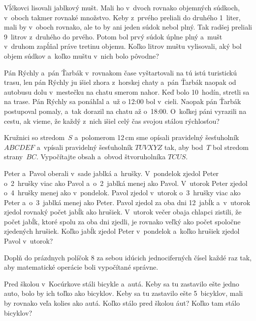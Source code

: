 {%
Vĺčkovci lisovali jablkový mušt. Mali ho v~dvoch rovnako objemných súdkoch,
v~oboch takmer rovnaké množstvo. Keby z~prvého preliali do druhého 1~liter,
mali by v~oboch rovnako, ale to by ani jeden súdok nebol plný. Tak radšej
preliali 9~litrov z~druhého do prvého. Potom bol prvý súdok úplne plný a~mušt
v~druhom zapĺňal práve tretinu objemu.
Koľko litrov muštu vylisovali, aký bol objem súdkov a~koľko muštu v~nich bolo
pôvodne?}

{%
Pán Rýchly a~pán Ťarbák v~rovnakom čase vyštartovali na tú istú turistickú trasu, len
pán Rýchly ju išiel zhora z~horskej chaty a~pán Ťarbák naopak od autobusu
dolu v~mestečku na chatu smerom nahor. Keď bolo 10~hodín, stretli sa na trase. Pán Rýchly
sa ponáhľal a~už o 12:00 bol v~cieli. Naopak pán Ťarbák postupoval pomaly,
a~tak dorazil na chatu až o~18:00.
O~koľkej páni vyrazili na cestu, ak vieme, že každý z~nich
išiel celý čas svojou stálou rýchlosťou?}

{%
Kružnici so stredom~$S$ a~polomerom 12\,cm sme opísali pravidelný
šesťuholník $ABCDEF$ a~vpísali pravidelný šesťuholník $TUVXYZ$ tak, aby
bod~$T$ bol stredom strany~$BC$.
Vypočítajte obsah a~obvod štvoruholníka $TCUS$.}

{%
Peter a~Pavol oberali v~sade jablká a~hrušky. V~pondelok zjedol Peter o~2~hrušky
viac ako Pavol a~o~2~jablká menej ako Pavol. V~utorok Peter zjedol o~4~hrušky
menej ako v~pondelok. Pavol zjedol v~utorok o~3~hrušky viac ako Peter
a~o~3~jablká menej ako Peter. Pavol zjedol za oba dni 12~jabĺk a~v~utorok zjedol
rovnaký počet jabĺk ako hrušiek. V~utorok večer obaja chlapci zistili, že
počet jabĺk, ktoré spolu za oba dni zjedli, je rovnako veľký ako počet
spoločne zjedených hrušiek.
Koľko jabĺk zjedol Peter v~pondelok a~koľko hrušiek zjedol Pavol v~utorok?}

{%
Doplň do prázdnych políčok 8 za sebou idúcich jednociferných čísel každé raz tak, aby matematické operácie boli vypočítané správne.
%
}

{%
Pred školou v~Kocúrkove stáli bicykle a~autá. Keby sa tu zastavilo ešte jedno auto, bolo by ich toľko ako bicyklov. Keby sa tu zastavilo ešte 5~bicyklov, mali by rovnako veľa kolies ako autá. Koľko stálo pred školou áut? Koľko tam stálo bicyklov?}

